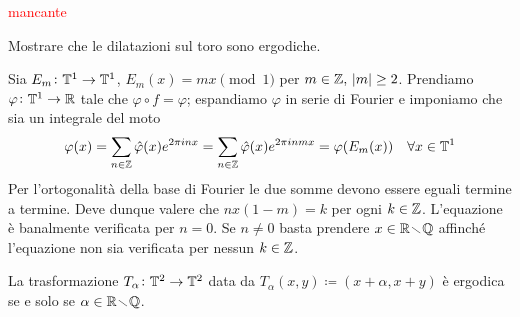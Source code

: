 \begin{example}
    \textcolor{red}{mancante}
\end{example}

\begin{exercise}
    Mostrare che le dilatazioni sul toro sono ergodiche.
\end{exercise}
\begin{solution}
    Sia $ E_m\colon\mathbb{T}^1\to\mathbb{T}^1 $, $ E_m(x) = mx\pmod{1} $ per $ m\in\mathbb{Z},\ \abs{m} \geq 2 $. Prendiamo $ \varphi\colon\mathbb{T}^1\to\mathbb{R} $ tale che $ \varphi\circ f = \varphi $; espandiamo $ \varphi $ in serie di Fourier e imponiamo che sia un integrale del moto
    \[ \varphi(x) = \sum_{n\in\mathbb{Z}} \hat\varphi(x) e^{2\pi i n x} = \sum_{n\in\mathbb{Z}} \hat\varphi(x) e^{2\pi i n m x} = \varphi(E_m(x)) \quad \forall x\in\mathbb{T}^1 \]
    Per l'ortogonalità della base di Fourier le due somme devono essere eguali termine a termine. Deve dunque valere che $ nx(1-m) = k $ per ogni $ k\in\mathbb{Z} $. L'equazione è banalmente verificata per $ n = 0 $. Se $ n\neq 0 $ basta prendere $ x\in\mathbb{R}\!\smallsetminus\!\mathbb{Q} $ affinché l'equazione non sia verificata per nessun $ k\in\mathbb{Z} $.
\end{solution}

\begin{exercise}
    La trasformazione $ T_\alpha \colon \mathbb{T}^2 \to \mathbb{T}^2 $ data da $ T_\alpha(x, y) \coloneqq (x+\alpha, x+y) $ è ergodica se e solo se $ \alpha \in \mathbb{R} \!\smallsetminus\! \mathbb{Q} $.
\end{exercise}

